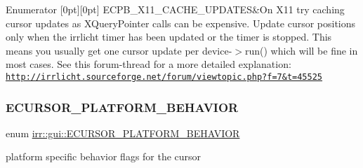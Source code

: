 \begin{DoxyEnumFields}{Enumerator}
[0pt][0pt]{}\mbox{\label{namespaceirr_1_1gui_abbd186f9cfba2f805d98248df226acefa368fcb0e1b11b1acaae73d44b482ba4a}} 
E\+C\+P\+B\+\_\+\+X11\+\_\+\+C\+A\+C\+H\+E\+\_\+\+U\+P\+D\+A\+T\+ES&On X11 try caching cursor updates as X\+Query\+Pointer calls can be expensive. Update cursor positions only when the irrlicht timer has been updated or the timer is stopped. This means you usually get one cursor update per device-\/$>$run() which will be fine in most cases. See this forum-\/thread for a more detailed explanation\+: \href{http://irrlicht.sourceforge.net/forum/viewtopic.php?f=7&t=45525}{\tt http\+://irrlicht.\+sourceforge.\+net/forum/viewtopic.\+php?f=7\&t=45525} \\
\hline

\end{DoxyEnumFields}
\mbox{\label{namespaceirr_1_1gui_abbd186f9cfba2f805d98248df226acef}} 
\subsubsection{\texorpdfstring{E\+C\+U\+R\+S\+O\+R\+\_\+\+P\+L\+A\+T\+F\+O\+R\+M\+\_\+\+B\+E\+H\+A\+V\+I\+OR}{ECURSOR\_PLATFORM\_BEHAVIOR}\hspace{0.1cm}{\footnotesize\ttfamily [2/2]}}
{\footnotesize\ttfamily enum \hyperlink{namespaceirr_1_1gui_abbd186f9cfba2f805d98248df226acef}{irr\+::gui\+::\+E\+C\+U\+R\+S\+O\+R\+\_\+\+P\+L\+A\+T\+F\+O\+R\+M\+\_\+\+B\+E\+H\+A\+V\+I\+OR}}



platform specific behavior flags for the cursor 

